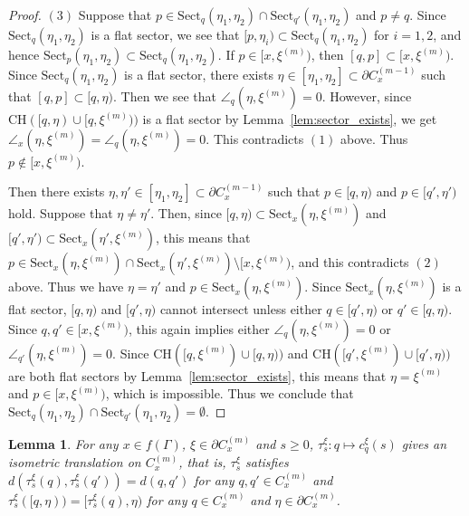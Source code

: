 \documentclass[12pt]{amsart}
\numberwithin{equation}{section}
\theoremstyle{plain}
\newtheorem{Lemma}[Theorem]{Lemma}
\theoremstyle{definition}
\theoremstyle{remark}
\newcommand{\xxi}[1]{\xi^{(#1)}}
\newcommand{\ray}[1]{[#1)}
\newcommand{\cc}[2]{c_{#1}^{#2}}
\newcommand{\trans}[2]{\tau_{#1}^{#2}}
\newcommand{\ch}[1]{\mathrm{CH}(#1)}
\newcommand{\sect}[3][]{\mathrm{Sect}_{#1}(#2,#3)}
\newcommand{\cone}[2][]{C_{#1}^{(#2)}}
\begin{document}
\begin{proof}
 $(3)$ Suppose that 
 $p \in \sect[q]{\eta_1}{\eta_2}\cap \sect[q']{\eta_1}{\eta_2}$
 and $p\not=q$. 
 Since $\sect[q]{\eta_1}{\eta_2}$ is a flat sector, we see that 
 $\ray{p,\eta_i} \subset \sect[q]{\eta_1}{\eta_2}$ for $i=1,2$, 
 and hence 
 $\sect[p]{\eta_1}{\eta_2} \subset \sect[q]{\eta_1}{\eta_2}$.  
 If $p \in \ray{x,\xxi{m}}$, then $[q,p]\subset \ray{x,\xxi{m}}$. 
 Since $\sect[q]{\eta_1}{\eta_2}$ is a flat sector, there exists 
 $\eta \in [\eta_1,\eta_2]\subset \partial \cone[x]{m-1}$ such that 
 $[q,p] \subset \ray{q,\eta}$. 
 Then we see that $\angle_{q}(\eta,\xxi{m})=0$. 
 However, since
 $\ch{\ray{q,\eta}\cup \ray{q,\xxi{m}}}$ is a flat sector
 by Lemma~\ref{lem:sector_exists}, 
 we get $\angle_{x}(\eta,\xxi{m})=\angle_{q}(\eta,\xxi{m})=0$. 
 This contradicts $(1)$ above. 
 Thus $p \not\in \ray{x,\xxi{m}}$. 

 Then there exists 
 $\eta, \eta' \in [\eta_1,\eta_2] \subset \partial \cone[x]{m-1}$
 such that $p \in \ray{q,\eta}$ and $p \in \ray{q',\eta'}$ hold. 
 Suppose that $\eta\not= \eta'$. 
 Then, since $\ray{q,\eta} \subset \sect[x]{\eta}{\xxi{m}}$ and
 $\ray{q',\eta'} \subset \sect[x]{\eta'}{\xxi{m}}$, this means that 
 $p \in \sect[x]{\eta}{\xxi{m}}\cap \sect[x]{\eta'}{\xxi{m}}
 \setminus \ray{x,\xxi{m}}$, 
 and this contradicts $(2)$ above. 
 Thus we have $\eta=\eta'$ and 
 $p \in \sect[x]{\eta}{\xxi{m}}$. 
 Since $\sect[x]{\eta}{\xxi{m}}$ is a flat sector, 
 $\ray{q,\eta}$ and $\ray{q',\eta}$ cannot intersect unless 
 either $q \in \ray{q',\eta}$ or $q' \in \ray{q,\eta}$. 
 Since $q,q' \in \ray{x,\xxi{m}}$, this again implies
 either $\angle_{q}(\eta,\xxi{m})=0$ or 
 $\angle_{q'}(\eta,\xxi{m})=0$. 
 Since $\ch{\ray{q,\xxi{m}}\cup \ray{q,\eta}}$ and 
 $\ch{\ray{q',\xxi{m}}\cup \ray{q',\eta}}$ are both flat
 sectors by Lemma~\ref{lem:sector_exists}, this means that 
 $\eta=\xxi{m}$ and $p \in \ray{x,\xxi{m}}$, which is impossible. 
 Thus we conclude that 
 $\sect[q]{\eta_1}{\eta_2}\cap \sect[q']{\eta_1}{\eta_2}=\emptyset$. 
\end{proof}

%
%
\begin{Lemma}
 \label{lem:tau_extends}
 For any $x\in f(\Gamma)$, $\xi \in \partial C_{x}^{(m)}$ and $s\geq 0$, 
 $\trans{s}{\xi}\colon q \mapsto \cc{q}{\xi}(s)$ gives an isometric
 translation on $\cone[x]{m}$, that is,  $\trans{s}{\xi}$ satisfies
 $d(\trans{s}{\xi}(q), \trans{s}{\xi}(q'))=d(q,q')$ for any 
 $q,q' \in \cone[x]{m}$ and
 $\trans{s}{\xi}(\ray{q,\eta})=\ray{\trans{s}{\xi}(q),\eta}$ for any 
 $q \in \cone[x]{m}$ and $\eta \in \partial \cone[x]{m}$. 
\end{Lemma}
\end{document}
